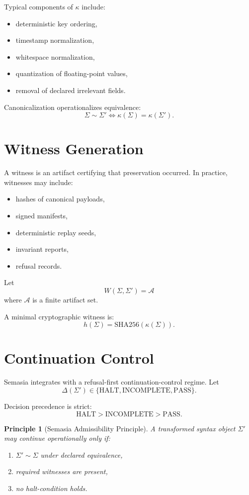 \documentclass[11pt]{article}
\newtheorem{principle}{Principle}
\begin{document}
Typical components of $\kappa$ include:
\begin{itemize}[leftmargin=2em]
\item deterministic key ordering,
\item timestamp normalization,
\item whitespace normalization,
\item quantization of floating-point values,
\item removal of declared irrelevant fields.
\end{itemize}

Canonicalization operationalizes equivalence:
\[
\Sigma \sim \Sigma' \iff \kappa(\Sigma)=\kappa(\Sigma').
\]

\section{Witness Generation}

A witness is an artifact certifying that preservation occurred. In practice, witnesses may include:
\begin{itemize}[leftmargin=2em]
\item hashes of canonical payloads,
\item signed manifests,
\item deterministic replay seeds,
\item invariant reports,
\item refusal records.
\end{itemize}

Let
\[
W(\Sigma,\Sigma') = \mathcal{A}
\]
where $\mathcal{A}$ is a finite artifact set.

A minimal cryptographic witness is:
\[
h(\Sigma) = \mathrm{SHA256}(\kappa(\Sigma)).
\]

\section{Continuation Control}

Semasia integrates with a refusal-first continuation-control regime. Let
\[
\Delta(\Sigma') \in \{\mathrm{HALT},\mathrm{INCOMPLETE},\mathrm{PASS}\}.
\]

Decision precedence is strict:
\[
\mathrm{HALT} > \mathrm{INCOMPLETE} > \mathrm{PASS}.
\]

\begin{principle}[Semasia Admissibility Principle]
A transformed syntax object $\Sigma'$ may continue operationally only if:
\begin{enumerate}[leftmargin=2em]
\item $\Sigma' \sim \Sigma$ under declared equivalence,
\item required witnesses are present,
\item no halt-condition holds.
\end{enumerate}
\end{principle}
\end{document}
